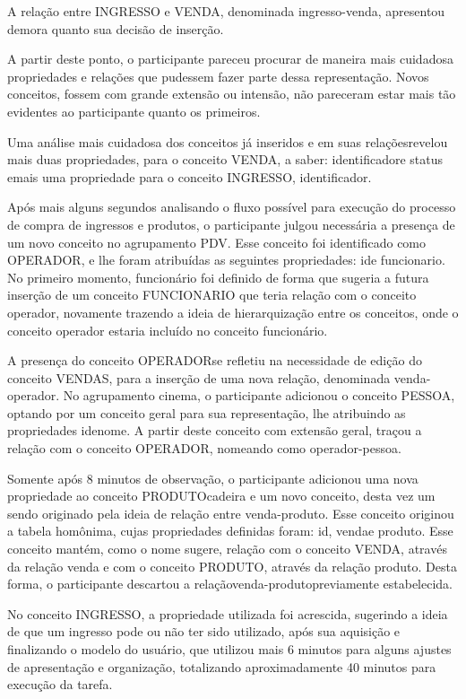 A relação entre INGRESSO e VENDA, denominada ingresso-venda, apresentou demora quanto sua decisão de inserção.

A partir deste ponto, o participante pareceu procurar de maneira mais cuidadosa propriedades e relações que pudessem fazer parte dessa representação. Novos conceitos, fossem com grande extensão ou intensão, não pareceram estar mais tão evidentes ao participante quanto os primeiros.

Uma análise mais cuidadosa dos conceitos já inseridos e em suas relaçõesrevelou mais duas propriedades, para o conceito VENDA, a saber: identificadore status emais uma propriedade para o conceito INGRESSO, identificador.

Após mais alguns segundos analisando o fluxo possível para execução do processo de compra de ingressos e produtos, o participante julgou necessária a presença de um novo conceito no agrupamento PDV. Esse conceito foi identificado como OPERADOR, e lhe foram atribuídas as seguintes propriedades: ide funcionario. No primeiro momento, funcionário foi definido de forma que sugeria a futura inserção de um conceito FUNCIONARIO que teria relação com o conceito operador, novamente trazendo a ideia de hierarquização entre os conceitos, onde o conceito operador estaria incluído no conceito funcionário.

A presença do conceito OPERADORse refletiu na necessidade de edição do conceito VENDAS, para a inserção de uma nova relação, denominada venda-operador. No agrupamento cinema, o participante adicionou o conceito PESSOA, optando por um conceito geral para sua representação, lhe atribuindo as propriedades idenome. A partir deste conceito com extensão geral, traçou a relação com o conceito OPERADOR, nomeando como operador-pessoa.

Somente após 8 minutos de observação, o participante adicionou uma nova propriedade ao conceito PRODUTOcadeira e um novo conceito, desta vez um sendo originado pela ideia de relação entre venda-produto. Esse conceito originou a tabela homônima, cujas propriedades definidas foram: id, vendae produto. Esse conceito mantém, como o nome sugere, relação com o conceito VENDA, através da relação venda e com o conceito PRODUTO, através da relação produto. Desta forma, o participante descartou a relaçãovenda-produtopreviamente estabelecida.

No conceito INGRESSO, a propriedade utilizada foi acrescida, sugerindo a ideia de que um ingresso pode ou não ter sido utilizado, após sua aquisição e finalizando o modelo do usuário, que utilizou mais 6 minutos para alguns ajustes de apresentação e organização, totalizando aproximadamente 40 minutos para execução da tarefa.

